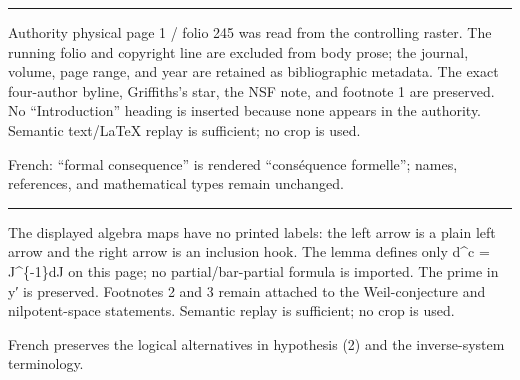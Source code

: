 \documentclass[
  english,
  a3paper,
  a3paper]{extarticle}
\author{}
\date{}
\begin{document}



\par

\vspace{0.7mm}\hrule\vspace{1.6mm}

\fontsize{11}{14}\selectfont

Authority physical page 1 / folio 245 was read from the controlling
raster. The running folio and copyright line are excluded from body
prose; the journal, volume, page range, and year are retained as
bibliographic metadata. The exact four-author byline, Griffiths's star,
the NSF note, and footnote 1 are preserved. No ``Introduction'' heading
is inserted because none appears in the authority. Semantic text/LaTeX
replay is sufficient; no crop is used.

French: ``formal consequence'' is rendered ``conséquence formelle'';
names, references, and mathematical types remain unchanged.

\clearpage



\par

\vspace{0.7mm}\hrule\vspace{1.6mm}

\fontsize{11}{14}\selectfont

The displayed algebra maps have no printed labels: the left arrow is a
plain left arrow and the right arrow is an inclusion hook. The lemma
defines only d\^{}c = J\^{}\{-1\}dJ on this page; no partial/bar-partial
formula is imported. The prime in y′ is preserved. Footnotes 2 and 3
remain attached to the Weil-conjecture and nilpotent-space statements.
Semantic replay is sufficient; no crop is used.

French preserves the logical alternatives in hypothesis (2) and the
inverse-system terminology.

\clearpage


\end{document}
